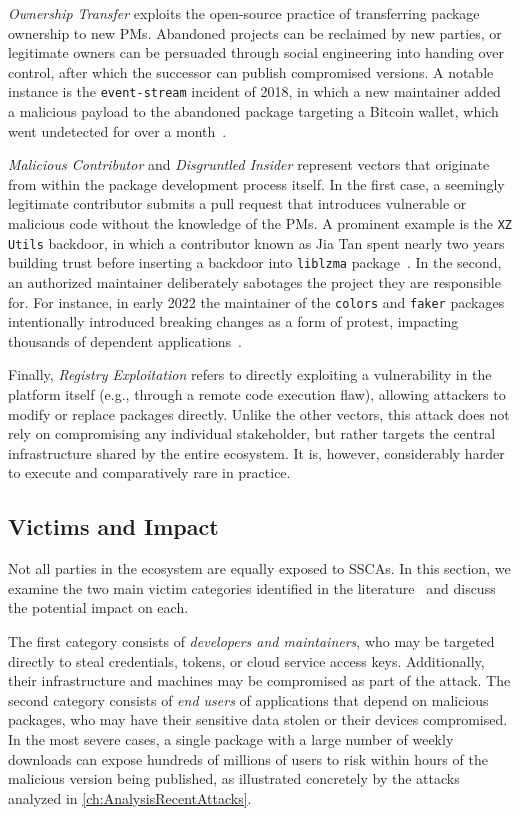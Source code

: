 \emph{Ownership Transfer} exploits the open-source practice of transferring package ownership to new \acp{PM}. 
Abandoned projects can be reclaimed by new parties, 
or legitimate owners can be persuaded through social engineering into handing over control,
after which the successor can publish compromised versions.
A notable instance is the \texttt{event-stream} incident of 2018, 
in which a new maintainer added a malicious payload to the abandoned package targeting a Bitcoin wallet, 
which went undetected for over a month~\cite{techtarget2018eventstream}.

\emph{Malicious Contributor} and \emph{Disgruntled Insider} represent vectors that originate from within the package development process itself.
In the first case, a seemingly legitimate contributor submits a pull request that introduces vulnerable or malicious code
without the knowledge of the \acp{PM}.
A prominent example is the \texttt{XZ Utils} backdoor, in which a contributor known as Jia Tan spent nearly two years building trust
before inserting a backdoor into \texttt{liblzma} package~\cite{akamai2024xzutils}.
In the second, an authorized maintainer deliberately sabotages the project they are responsible for.
For instance, in early 2022 the maintainer of the \texttt{colors} and \texttt{faker} packages 
intentionally introduced breaking changes as a form of protest,
impacting thousands of dependent applications~\cite{bleepingcomputer2022}.

Finally, \emph{Registry Exploitation} refers to directly exploiting a vulnerability 
in the platform itself (e.g., through a remote code execution flaw), 
allowing attackers to modify or replace packages directly.
Unlike the other vectors, this attack does not rely on compromising any individual stakeholder, 
but rather targets the central infrastructure shared by the entire ecosystem.
It is, however, considerably harder to execute and comparatively rare in practice.

\subsection{Victims and Impact}
\label{subsec:VictimsAndImpact}

Not all parties in the ecosystem are equally exposed to \acp{SSCA}.
In this section, we examine the two main victim categories identified in the literature~\cite{duan2020measuringsupplychainattacks} 
and discuss the potential impact on each.

The first category consists of \emph{developers and maintainers}, who may be targeted directly
to steal credentials, tokens, or cloud service access keys.
Additionally, their infrastructure and machines may be compromised as part of the attack.
The second category consists of \emph{end users} of applications that depend on malicious packages,
who may have their sensitive data stolen or their devices compromised.
In the most severe cases, a single package with a large number of weekly downloads
can expose hundreds of millions of users to risk within hours of the malicious version being published,
as illustrated concretely by the attacks analyzed in \cref{ch:AnalysisRecentAttacks}.

